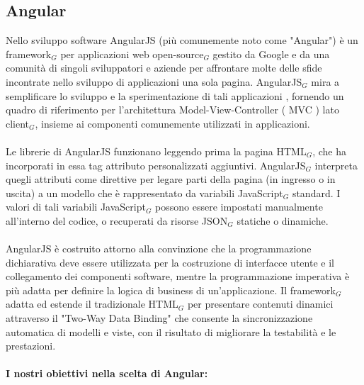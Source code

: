 \subsection{Angular}

Nello sviluppo software AngularJS (più comunemente noto come "Angular") è un framework$_G$  per applicazioni web open-source$_G$ gestito da Google e da una comunità di singoli sviluppatori e aziende per affrontare molte delle sfide incontrate nello sviluppo di applicazioni una sola pagina. AngularJS$_G$ mira a 
semplificare lo sviluppo e la sperimentazione di tali applicazioni , fornendo un quadro di riferimento per l'architettura Model-View-Controller ( MVC ) lato client$_G$, insieme ai componenti comunemente utilizzati in applicazioni.\\
\\
Le librerie di AngularJS funzionano leggendo prima la pagina HTML$_G$, che ha incorporati in essa tag attributo personalizzati aggiuntivi. AngularJS$_G$ interpreta quegli attributi come direttive per legare parti della pagina (in ingresso o in uscita) a un modello che è rappresentato da variabili JavaScript$_G$ standard. I valori di tali variabili JavaScript$_G$ possono essere impostati manualmente all'interno del codice, o recuperati da risorse JSON$_G$ statiche o dinamiche.\\
\\
AngularJS è costruito attorno alla convinzione che la programmazione dichiarativa deve essere utilizzata per la costruzione di interfacce utente e il collegamento dei componenti software, mentre la programmazione imperativa è più adatta per definire la logica di business di un'applicazione. Il  framework$_G$ adatta ed estende il tradizionale HTML$_G$ per presentare contenuti dinamici attraverso il "Two-Way Data Binding" che consente la sincronizzazione automatica di modelli e viste, con il risultato di migliorare la testabilità e le prestazioni.\\
\\
\textbf{I nostri obiettivi nella scelta di Angular:
}

